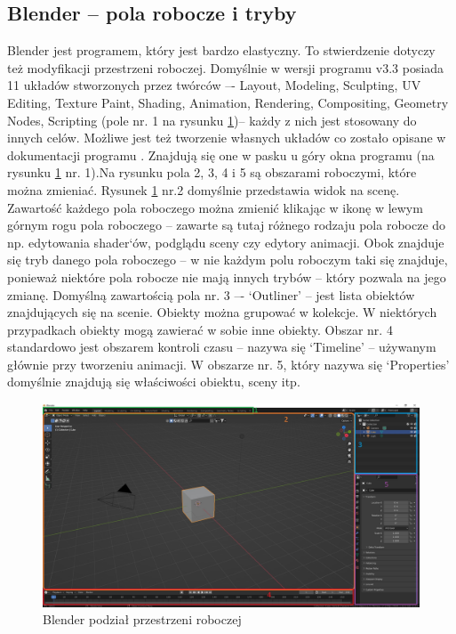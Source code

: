 \documentclass[12pt,twoside]{article}
\begin{document}
\subsection{Blender -- pola robocze i tryby}
Blender jest programem, który jest bardzo elastyczny. To stwierdzenie dotyczy
też modyfikacji przestrzeni roboczej. Domyślnie w wersji programu v3.3 posiada
11 układów stworzonych przez twórców –- Layout, Modeling, Sculpting, UV Editing,
Texture  Paint, Shading, Animation, Rendering, Compositing, Geometry Nodes,
Scripting (pole nr. 1 na rysunku \ref{Bledner:workspaces})-- każdy z nich jest
stosowany do innych celów. Możliwe jest też tworzenie własnych układów co zostało
opisane w dokumentacji programu \cite{blender_window_workspaces}. 
Znajdują się one w pasku u góry okna programu (na rysunku
\ref{Bledner:workspaces} nr. 1).Na rysunku pola 2, 3, 4 i 5 są obszarami
roboczymi, które można zmieniać. \cite{blender_workspace_show} Rysunek
\ref{Bledner:workspaces} nr.2 domyślnie przedstawia widok na scenę. Zawartość
każdego pola roboczego można zmienić klikając w ikonę w lewym górnym rogu pola
roboczego -- zawarte są tutaj różnego rodzaju pola robocze do np. edytowania
shader`ów, podglądu sceny czy edytory animacji. Obok znajduje się tryb danego
pola roboczego -- w nie każdym polu roboczym taki się znajduje, ponieważ niektóre
pola robocze nie mają innych trybów -- który pozwala na jego zmianę. Domyślną
zawartością pola nr. 3 –- `Outliner' -- jest lista obiektów znajdujących się na
scenie. Obiekty można grupować w kolekcje. W niektórych przypadkach obiekty mogą
zawierać w sobie inne obiekty. Obszar nr. 4 standardowo jest obszarem kontroli
czasu -- nazywa się `Timeline' -- używanym głównie przy tworzeniu animacji. W
obszarze nr. 5, który nazywa się `Properties' domyślnie znajdują się właściwości
obiektu, sceny itp. 

\begin{figure}[h!]
    \centering
    \includegraphics[width=16cm]{BlenderPict/default_window_segments.jpg}
    \caption{Blender podział przestrzeni roboczej}
    \label{Bledner:workspaces}
\end{figure}
\end{document}
